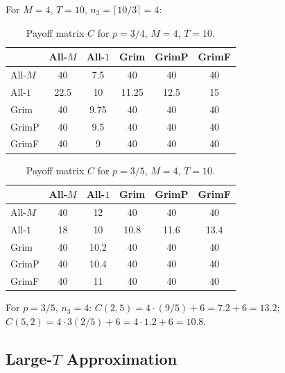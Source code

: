 \documentclass[12pt,a4paper]{article}
\begin{document}
For $M=4$, $T=10$, $n_3=\lceil 10/3\rceil=4$:

\begin{table}[H]
\centering
\caption{Payoff matrix $C$ for $p=3/4$, $M=4$, $T=10$.}
\label{tab:C_p075}
\renewcommand{\arraystretch}{1.25}
\begin{tabular}{lccccc}
\toprule
          & All-$M$ & All-$1$ & Grim   & GrimP  & GrimF  \\
\midrule
All-$M$   & 40      & 7.5     & 40     & 40     & 40     \\
All-$1$   & 22.5    & 10      & 11.25  & 12.5   & 15     \\
Grim      & 40      & 9.75    & 40     & 40     & 40     \\
GrimP     & 40      & 9.5     & 40     & 40     & 40     \\
GrimF     & 40      & 9       & 40     & 40     & 40     \\
\bottomrule
\end{tabular}
\end{table}

\begin{table}[H]
\centering
\caption{Payoff matrix $C$ for $p=3/5$, $M=4$, $T=10$.}
\label{tab:C_p060}
\renewcommand{\arraystretch}{1.25}
\begin{tabular}{lccccc}
\toprule
          & All-$M$ & All-$1$ & Grim   & GrimP  & GrimF  \\
\midrule
All-$M$   & 40      & 12      & 40     & 40     & 40     \\
All-$1$   & 18      & 10      & 10.8   & 11.6   & 13.4   \\
Grim      & 40      & 10.2    & 40     & 40     & 40     \\
GrimP     & 40      & 10.4    & 40     & 40     & 40     \\
GrimF     & 40      & 11      & 40     & 40     & 40     \\
\bottomrule
\end{tabular}
\end{table}

\noindent
For $p=3/5$, $n_3=4$:
$C(2,5)=4\cdot(9/5)+6 = 7.2+6 = 13.2$; $C(5,2)=4\cdot 3(2/5)+6=4\cdot1.2+6=10.8$.

\subsection{Large-$T$ Approximation}
\end{document}
